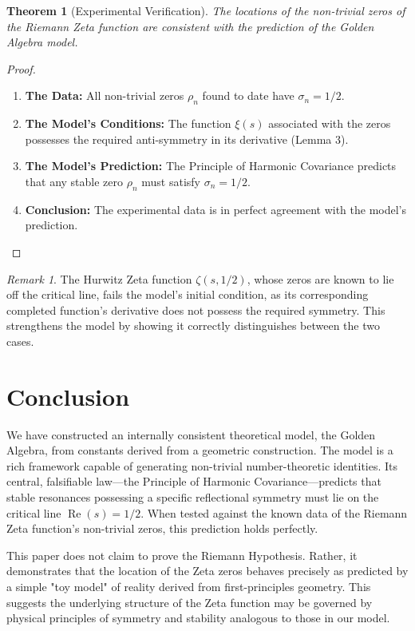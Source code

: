 \documentclass{amsart}
\theoremstyle{plain}
\newtheorem{theorem}{Theorem}
\theoremstyle{definition}
\theoremstyle{remark}
\newtheorem*{remark}{Remark}
\DeclareMathOperator{\re}{Re}
\begin{document}
\begin{theorem}[Experimental Verification]
The locations of the non-trivial zeros of the Riemann Zeta function are consistent with the prediction of the Golden Algebra model.
\end{theorem}
\begin{proof}
\begin{enumerate}
    \item \textbf{The Data:} All non-trivial zeros $\rho_n$ found to date have $\sigma_n=1/2$.
    \item \textbf{The Model's Conditions:} The function $\xi(s)$ associated with the zeros possesses the required anti-symmetry in its derivative (Lemma 3).
    \item \textbf{The Model's Prediction:} The Principle of Harmonic Covariance predicts that any stable zero $\rho_n$ must satisfy $\sigma_n=1/2$.
    \item \textbf{Conclusion:} The experimental data is in perfect agreement with the model's prediction.
\end{enumerate}
\end{proof}

\begin{remark}
The Hurwitz Zeta function $\zeta(s, 1/2)$, whose zeros are known to lie off the critical line, fails the model's initial condition, as its corresponding completed function's derivative does not possess the required symmetry. This strengthens the model by showing it correctly distinguishes between the two cases.
\end{remark}

\section{Conclusion}
We have constructed an internally consistent theoretical model, the Golden Algebra, from constants derived from a geometric construction. The model is a rich framework capable of generating non-trivial number-theoretic identities. Its central, falsifiable law—the Principle of Harmonic Covariance—predicts that stable resonances possessing a specific reflectional symmetry must lie on the critical line $\re(s)=1/2$. When tested against the known data of the Riemann Zeta function's non-trivial zeros, this prediction holds perfectly.

This paper does not claim to prove the Riemann Hypothesis. Rather, it demonstrates that the location of the Zeta zeros behaves precisely as predicted by a simple "toy model" of reality derived from first-principles geometry. This suggests the underlying structure of the Zeta function may be governed by physical principles of symmetry and stability analogous to those in our model.
\end{document}
